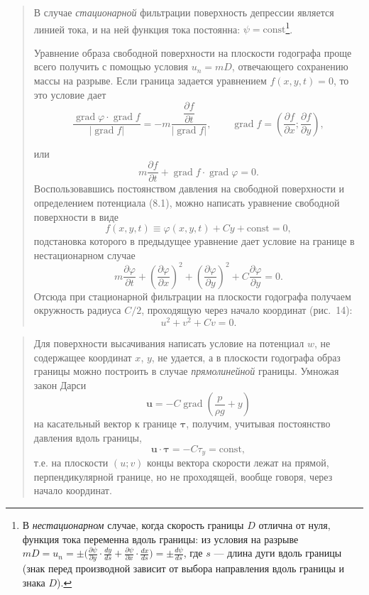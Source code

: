 \documentclass[12pt,a4paper]{article}
\DeclareMathOperator{\grad}{grad}
\newenvironment{textquote}{\begin{quote}\sloppy}{\end{quote}}
\begin{document}
\begin{textquote}
В случае \textit{стационарной} фильтрации поверхность депрессии является линией тока, и на ней функция тока постоянна: $\psi=\mathrm{const}$\footnote[1]{В \textit{нестационарном} случае, когда скорость границы $D$ отлична от нуля, функция тока переменна вдоль границы: из условия на разрыве $mD=u_n=\pm\bigl(\frac{\partial\psi}{\partial y}\cdot\frac{dy}{ds}+\frac{\partial\psi}{\partial x}\cdot\frac{dx}{ds}\bigr)=\pm\frac{d\psi}{ds}$, где $s$ --- длина дуги вдоль границы (знак перед производной зависит от выбора направления вдоль границы и знака $D$).}.

Уравнение образа свободной поверхности на плоскости годографа проще всего получить с помощью условия $u_n=mD$, отвечающего сохранению массы на разрыве. Если граница задается уравнением $f(x,y,t)=0$, то это условие дает
\[
\frac{\grad\varphi\cdot\grad f}{|\grad f|}=-m\frac{\dfrac{\partial f}{\partial t}}{|\grad f|},\qquad
\grad f=\left(\frac{\partial f}{\partial x};\frac{\partial f}{\partial y}\right),
\]


или
\[
m\frac{\partial f}{\partial t}+\grad f\cdot\grad\varphi=0.
\]
Воспользовавшись постоянством давления на свободной поверхности и определением потенциала (8.1), можно написать уравнение свободной поверхности в виде
\[
f(x,y,t)\equiv\varphi(x,y,t)+Cy+\mathrm{const}=0,
\]
подстановка которого в предыдущее уравнение дает условие на границе в нестационарном случае
\[
m\frac{\partial\varphi}{\partial t}+\left(\frac{\partial\varphi}{\partial x}\right)^2+\left(\frac{\partial\varphi}{\partial y}\right)^2+C\frac{\partial\varphi}{\partial y}=0.
\]
Отсюда при стационарной фильтрации на плоскости годографа получаем окружность радиуса $C/2$, проходящую через начало координат (рис.~14):
\[
u^2+v^2+Cv=0.
\]
\end{textquote}

\begin{textquote}
Для поверхности высачивания написать условие на потенциал $w$, не содержащее координат $x$, $y$, не удается, а в плоскости годографа образ границы можно построить в случае \textit{прямолинейной} границы. Умножая закон Дарси
\[
\boldsymbol{u}=-C\grad\left(\frac{p}{\rho g}+y\right)
\]
на касательный вектор к границе $\boldsymbol{\tau}$, получим, учитывая постоянство давления вдоль границы,
\[
\boldsymbol{u}\cdot\boldsymbol{\tau}=-C\tau_y=\mathrm{const},
\]
т.е. на плоскости $(u;v)$ концы вектора скорости лежат на прямой, перпендикулярной границе, но не проходящей, вообще говоря, через начало координат.
\end{textquote}
\end{document}
